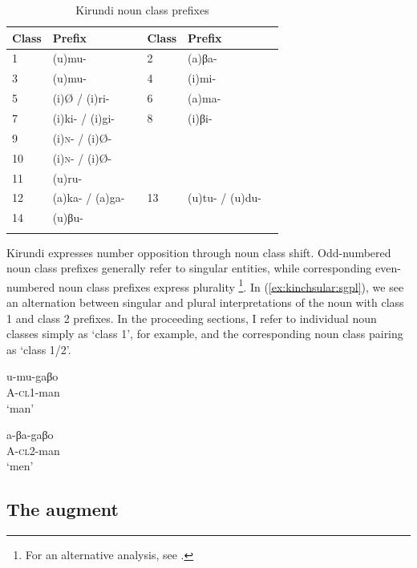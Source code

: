 \documentclass[output=paper,colorlinks,citecolor=brown,
]{langscibook}
\begin{document}
\begin{table}
\caption{Kirundi noun class prefixes}
\label{tab:kinchsular:nounclasses}
\begin{tabular}{llllll}
  \lsptoprule
        Class & Prefix & & Class & Prefix \\
        \midrule
         1 & (u)mu- & & 2 & (a)βa- \\
         3 & (u)mu- & & 4 & (i)mi- \\
         5 & (i)Ø / (i)ri- & & 6 & (a)ma- \\
         7 & (i)ki- / (i)gi- & & 8 & (i)βi- \\
         9 & (i){\textsc{n}}- / (i)Ø- & & & \\  
         10 & (i){\textsc{n}}- / (i)Ø- & & & \\         
         11 & (u)ru- & & & \\
         12 & (a)ka- / (a)ga- & & 13 & (u)tu- / (u)du- \\ 
         14 & (u)βu- & & & \\
  \lspbottomrule
\end{tabular}
\end{table}

Kirundi expresses number opposition through noun class shift. Odd-numbered noun class prefixes generally refer to singular entities, while corresponding even-numbered noun class prefixes express plurality \citep[, a.o.]{ndayiragije2012augment, Velde2019, zorc2007kinyarwanda}\footnote{For an alternative analysis, see \citet{Mufwene1980NumberCA}.}. In (\ref{ex:kinchsular:sgpl}), we see an alternation between singular and plural interpretations of the noun with class 1 and class 2 prefixes. In the proceeding sections, I refer to individual noun classes simply as ‘class 1’, for example, and the corresponding noun class pairing as ‘class 1/2’.

\ea \label{ex:kinchsular:sgpl}
\begin{xlist}

\ex \label{ex:kinchsular:sg}
\gll u-mu-gaβo
\\ A-\textsc{cl1}-man \\
\glt `man'

\ex \label{ex:kinchsular:pl}
\gll a-βa-gaβo
\\ A-\textsc{cl2}-man \\
\glt `men'

\end{xlist}

\z 

\subsection{The augment} \label{sec:kinchsular:augment}
\end{document}

